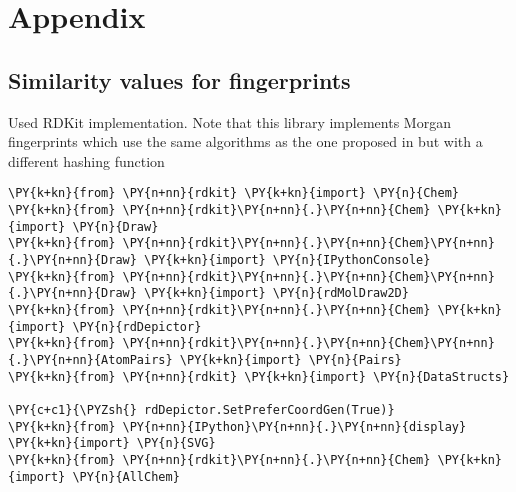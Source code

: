 
	
	






\appendix
\section*{Appendix}

\subsection{Similarity values for fingerprints}
\label{ch:a_sim}
Used RDKit\citep{rdkit} implementation. Note that this library implements Morgan fingerprints which use the same algorithms as the one proposed in \citep{ECFP} but with a different hashing function
    
    
    
    
    \hypersetup{
    	breaklinks=true,  %
    	colorlinks=true,
    	urlcolor=urlcolor,
    	linkcolor=linkcolor,
    	citecolor=citecolor,
    }
    \footnotesize
    

    
    \begin{tcolorbox}[breakable, size=fbox, boxrule=1pt, pad at break*=1mm,colback=cellbackground, colframe=cellborder]
\begin{Verbatim}[commandchars=\\\{\}]
\PY{k+kn}{from} \PY{n+nn}{rdkit} \PY{k+kn}{import} \PY{n}{Chem}
\PY{k+kn}{from} \PY{n+nn}{rdkit}\PY{n+nn}{.}\PY{n+nn}{Chem} \PY{k+kn}{import} \PY{n}{Draw}
\PY{k+kn}{from} \PY{n+nn}{rdkit}\PY{n+nn}{.}\PY{n+nn}{Chem}\PY{n+nn}{.}\PY{n+nn}{Draw} \PY{k+kn}{import} \PY{n}{IPythonConsole}
\PY{k+kn}{from} \PY{n+nn}{rdkit}\PY{n+nn}{.}\PY{n+nn}{Chem}\PY{n+nn}{.}\PY{n+nn}{Draw} \PY{k+kn}{import} \PY{n}{rdMolDraw2D}
\PY{k+kn}{from} \PY{n+nn}{rdkit}\PY{n+nn}{.}\PY{n+nn}{Chem} \PY{k+kn}{import} \PY{n}{rdDepictor}
\PY{k+kn}{from} \PY{n+nn}{rdkit}\PY{n+nn}{.}\PY{n+nn}{Chem}\PY{n+nn}{.}\PY{n+nn}{AtomPairs} \PY{k+kn}{import} \PY{n}{Pairs}
\PY{k+kn}{from} \PY{n+nn}{rdkit} \PY{k+kn}{import} \PY{n}{DataStructs}

\PY{c+c1}{\PYZsh{} rdDepictor.SetPreferCoordGen(True)}
\PY{k+kn}{from} \PY{n+nn}{IPython}\PY{n+nn}{.}\PY{n+nn}{display} \PY{k+kn}{import} \PY{n}{SVG}
\PY{k+kn}{from} \PY{n+nn}{rdkit}\PY{n+nn}{.}\PY{n+nn}{Chem} \PY{k+kn}{import} \PY{n}{AllChem}
\end{Verbatim}
\end{tcolorbox}

